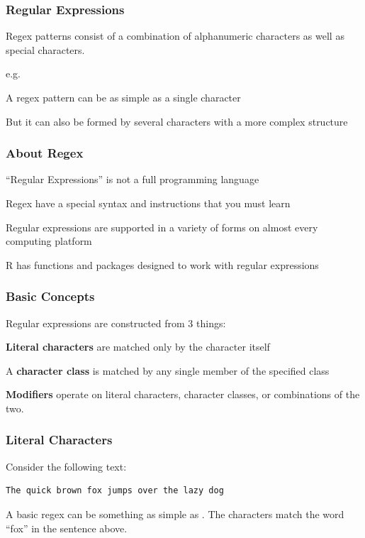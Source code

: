 \documentclass[12pt]{beamer}\usepackage[]{graphicx}\usepackage[]{color}
\begin{document}

\begin{frame}
\frametitle{Regular Expressions}

\bi
  \item Regex patterns consist of a combination of alphanumeric characters as well as special characters.
  \bi
    \item e.g. \code{[a-zA-Z0-9\_.]*}
  \ei
  \item A regex pattern can be as simple as a single character
  \item But it can also be formed by several characters with a more complex structure
\ei

\end{frame}


\begin{frame}
\frametitle{About Regex}

\bi
  \item ``Regular Expressions'' is not a full programming language
  \item Regex have a special syntax and instructions that you must learn
  \item Regular expressions are supported in a variety of forms on almost every computing platform
  \item R has functions and packages designed to work with regular expressions
\ei

\end{frame}


\begin{frame}
\frametitle{Basic Concepts}

Regular expressions are constructed from 3 things:
\bbi
  \item \textbf{Literal characters} are matched only by the character itself
  \item A \textbf{character class} is matched by any single member of the specified class
  \item \textbf{Modifiers} operate on literal characters, character classes, or combinations of the two.
\ei

\end{frame}


\begin{frame}[fragile]
\frametitle{Literal Characters}

Consider the following text:
\begin{verbatim}
The quick brown fox jumps over the lazy dog
\end{verbatim}

\bigskip

A basic regex can be something as simple as {\hilit {}}. The characters  match the word ``fox'' in the sentence above.

\end{frame}
\end{document}
